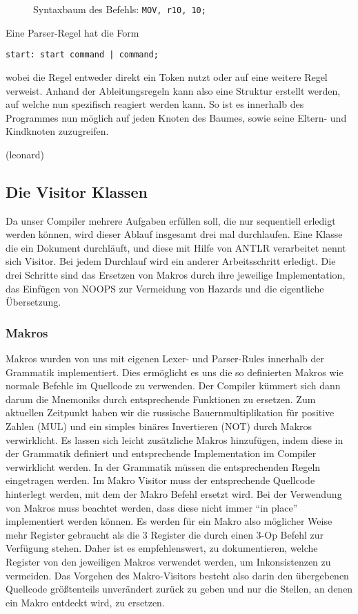 \documentclass[paper=a4,fontsize=12pt,twocolumn]{scrreprt}
\begin{document}
\begin{figure}[h]
\centering
\caption{Syntaxbaum des Befehls: \texttt{MOV, r10, 10;}}
\end{figure}

Eine Parser-Regel hat die Form
\begin{lstlisting}
start: start command | command;
\end{lstlisting}
wobei die Regel entweder direkt ein Token nutzt oder auf eine weitere Regel verweist.
Anhand der Ableitungsregeln kann also eine Struktur erstellt werden, auf welche nun spezifisch reagiert werden kann.
So ist es innerhalb des Programmes nun möglich auf jeden Knoten des Baumes, sowie seine Eltern- und Kindknoten zuzugreifen.

(leonard)

\subsection{Die Visitor Klassen}
Da unser Compiler mehrere Aufgaben erfüllen soll, die nur sequentiell erledigt werden können, wird dieser Ablauf insgesamt drei mal durchlaufen.
Eine Klasse die ein Dokument durchläuft, und diese mit Hilfe von ANTLR verarbeitet nennt sich Visitor.
Bei jedem Durchlauf wird ein anderer Arbeitsschritt erledigt.
Die drei Schritte sind das Ersetzen von Makros durch ihre jeweilige Implementation, das Einfügen von NOOPS zur Vermeidung von Hazards und die eigentliche Übersetzung.

\subsubsection{Makros}
Makros wurden von uns mit eigenen Lexer- und Parser-Rules innerhalb der Grammatik implementiert.
Dies ermöglicht es uns die so definierten Makros wie normale Befehle im Quellcode zu verwenden.
Der Compiler kümmert sich dann darum die Mnemoniks durch entsprechende Funktionen zu ersetzen.
Zum aktuellen Zeitpunkt haben wir die russische Bauernmultiplikation für positive Zahlen (MUL) und ein simples binäres Invertieren (NOT) durch Makros verwirklicht.
Es lassen sich leicht zusätzliche Makros hinzufügen, indem diese in der Grammatik definiert  und entsprechende Implementation im Compiler verwirklicht werden.
In der Grammatik müssen die entsprechenden Regeln eingetragen werden. Im Makro Visitor muss der entsprechende Quellcode hinterlegt werden, mit dem der Makro Befehl ersetzt wird.
Bei der Verwendung von Makros muss beachtet werden, dass diese nicht immer \enquote{in place} implementiert werden können.
Es werden für ein Makro also möglicher Weise mehr Register gebraucht als die 3 Register die durch einen 3-Op Befehl zur Verfügung stehen.
Daher ist es empfehlenswert, zu dokumentieren, welche Register von den jeweiligen Makros verwendet werden, um Inkonsistenzen zu vermeiden.
Das Vorgehen des Makro-Visitors besteht also darin den übergebenen Quellcode größtenteils unverändert zurück zu geben und nur die Stellen, an denen ein Makro entdeckt wird, zu ersetzen.
\end{document}
